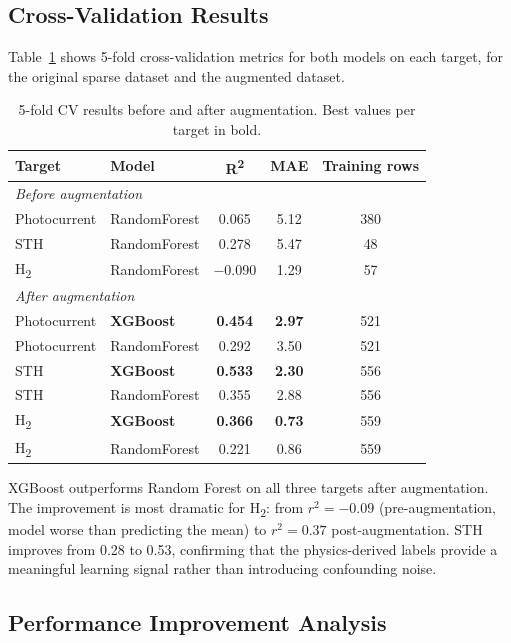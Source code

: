 \subsection{Cross-Validation Results}

Table~\ref{tab:cv_results} shows 5-fold cross-validation metrics for both models
on each target, for the original sparse dataset and the augmented dataset.

\begin{table}[h]
\centering
\caption{5-fold CV results before and after augmentation. Best values per target in bold.}
\label{tab:cv_results}
\begin{tabular}{llccc}
\toprule
Target & Model & R\textsuperscript{2} & MAE & Training rows \\
\midrule
\multicolumn{5}{l}{\textit{Before augmentation}} \\
Photocurrent & RandomForest & 0.065 & 5.12 & 380 \\
STH          & RandomForest & 0.278 & 5.47 & 48  \\
H\textsubscript{2} & RandomForest & $-$0.090 & 1.29 & 57 \\
\midrule
\multicolumn{5}{l}{\textit{After augmentation}} \\
Photocurrent & \textbf{XGBoost}      & \textbf{0.454} & \textbf{2.97} & 521 \\
Photocurrent & RandomForest & 0.292 & 3.50 & 521 \\
STH          & \textbf{XGBoost}      & \textbf{0.533} & \textbf{2.30} & 556 \\
STH          & RandomForest & 0.355 & 2.88 & 556 \\
H\textsubscript{2} & \textbf{XGBoost} & \textbf{0.366} & \textbf{0.73} & 559 \\
H\textsubscript{2} & RandomForest & 0.221 & 0.86 & 559 \\
\bottomrule
\end{tabular}
\end{table}

XGBoost outperforms Random Forest on all three targets after augmentation.
The improvement is most dramatic for H\textsubscript{2}: from $r^2 = -0.09$
(pre-augmentation, model worse than predicting the mean) to $r^2 = 0.37$
post-augmentation.
STH improves from 0.28 to 0.53, confirming that the physics-derived labels
provide a meaningful learning signal rather than introducing confounding noise.

\subsection{Performance Improvement Analysis}

